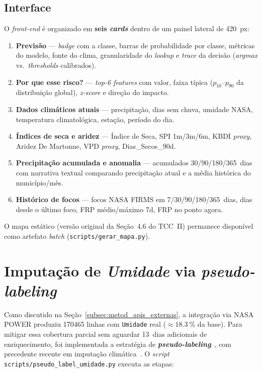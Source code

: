 \subsection{Interface}

O \emph{front-end} é organizado em \textbf{seis \emph{cards}} dentro de um painel lateral de \SI{420}{px}:

\begin{enumerate}
  \item \textbf{Previsão} --- \emph{badge} com a classe, barras de probabilidade por classe, métricas do modelo, fonte do clima, granularidade do \emph{lookup} e \emph{trace} da decisão (\emph{argmax} vs.\ \emph{thresholds} calibrados).
  \item \textbf{Por que esse risco?} --- \emph{top-6 features} com valor, faixa típica (\(p_{10}\)--\(p_{90}\) da distribuição global), \emph{z-score} e direção do impacto.
  \item \textbf{Dados climáticos atuais} --- precipitação, dias sem chuva, umidade NASA, temperatura climatológica, estação, período do dia.
  \item \textbf{Índices de seca e aridez} --- Índice de Seca, SPI 1m/3m/6m, KBDI \emph{proxy}, Aridez De Martonne, VPD \emph{proxy}, Dias\_Secos\_90d.
  \item \textbf{Precipitação acumulada e anomalia} --- acumulados 30/90/180/365~dias com narrativa textual comparando precipitação atual e a média histórica do município/mês.
  \item \textbf{Histórico de focos} --- focos NASA FIRMS em 7/30/90/180/365~dias, dias desde o último foco, FRP médio/máximo 7d, FRP no ponto agora.
\end{enumerate}

O mapa estático (versão original da Seção~4.6 do TCC~II) permanece disponível como artefato \emph{batch} (\texttt{scripts/gerar\_mapa.py}).


\section{Imputação de \emph{Umidade} via \emph{pseudo-labeling}}
\label{sec:metodologia_pseudo_label}

Como discutido na Seção~\ref{subsec:metod_apis_externas}, a integração via NASA POWER produziu \num{170465} linhas com \texttt{Umidade} real (\(\approx \SI{18,3}{\percent}\) da base). Para mitigar essa cobertura parcial sem aguardar 13~dias adicionais de enriquecimento, foi implementada a estratégia de \textbf{\emph{pseudo-labeling}}~\cite{lee2013pseudo}, com precedente recente em imputação climática~\cite{lopezgarcia2024spatiotemporal}. O \emph{script} \texttt{scripts/pseudo\_label\_umidade.py} executa as etapas:

